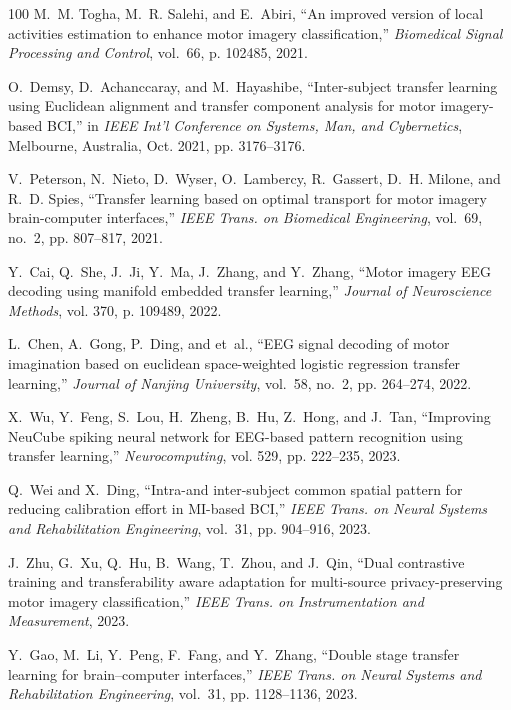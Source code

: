 \documentclass[journal]{IEEEtran}
\begin{document}
\begin{thebibliography}{100}
M.~M. Togha, M.~R. Salehi, and E.~Abiri, ``An improved version of local
  activities estimation to enhance motor imagery classification,''
  \emph{Biomedical Signal Processing and Control}, vol.~66, p. 102485, 2021.

O.~Demsy, D.~Achanccaray, and M.~Hayashibe, ``Inter-subject transfer learning
  using {Euclidean} alignment and transfer component analysis for motor
  imagery-based {BCI},'' in \emph{IEEE Int'l Conference on Systems, Man, and
  Cybernetics}, Melbourne, Australia, Oct. 2021, pp. 3176--3176.

V.~Peterson, N.~Nieto, D.~Wyser, O.~Lambercy, R.~Gassert, D.~H. Milone, and
  R.~D. Spies, ``Transfer learning based on optimal transport for motor imagery
  brain-computer interfaces,'' \emph{IEEE Trans. on Biomedical Engineering},
  vol.~69, no.~2, pp. 807--817, 2021.

Y.~Cai, Q.~She, J.~Ji, Y.~Ma, J.~Zhang, and Y.~Zhang, ``Motor imagery {EEG}
  decoding using manifold embedded transfer learning,'' \emph{Journal of
  Neuroscience Methods}, vol. 370, p. 109489, 2022.

L.~Chen, A.~Gong, P.~Ding, and et~al., ``{EEG} signal decoding of motor
  imagination based on euclidean space-weighted logistic regression transfer
  learning,'' \emph{Journal of Nanjing University}, vol.~58, no.~2, pp.
  264--274, 2022.

X.~Wu, Y.~Feng, S.~Lou, H.~Zheng, B.~Hu, Z.~Hong, and J.~Tan, ``Improving
  {NeuCube} spiking neural network for {EEG}-based pattern recognition using
  transfer learning,'' \emph{Neurocomputing}, vol. 529, pp. 222--235, 2023.

Q.~Wei and X.~Ding, ``Intra-and inter-subject common spatial pattern for
  reducing calibration effort in {MI}-based {BCI},'' \emph{IEEE Trans. on
  Neural Systems and Rehabilitation Engineering}, vol.~31, pp. 904--916, 2023.

J.~Zhu, G.~Xu, Q.~Hu, B.~Wang, T.~Zhou, and J.~Qin, ``Dual contrastive training
  and transferability aware adaptation for multi-source privacy-preserving
  motor imagery classification,'' \emph{IEEE Trans. on Instrumentation and
  Measurement}, 2023.

Y.~Gao, M.~Li, Y.~Peng, F.~Fang, and Y.~Zhang, ``Double stage transfer learning
  for brain--computer interfaces,'' \emph{IEEE Trans. on Neural Systems and
  Rehabilitation Engineering}, vol.~31, pp. 1128--1136, 2023.


\end{thebibliography}
\end{document}
